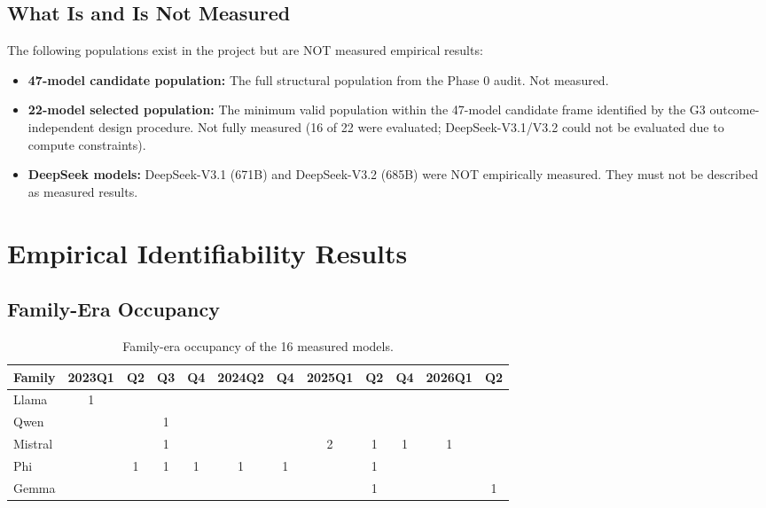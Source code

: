 \documentclass[journal]{IEEEtran}
\begin{document}
\subsection{What Is and Is Not Measured}

The following populations exist in the project but are NOT measured empirical results:
\begin{itemize}
\item \textbf{47-model candidate population:} The full structural population from the Phase 0 audit. Not measured.
\item \textbf{22-model selected population:} The minimum valid population within the 47-model candidate frame identified by the G3 outcome-independent design procedure. Not fully measured (16 of 22 were evaluated; DeepSeek-V3.1/V3.2 could not be evaluated due to compute constraints).
\item \textbf{DeepSeek models:} DeepSeek-V3.1 (671B) and DeepSeek-V3.2 (685B) were NOT empirically measured. They must not be described as measured results.
\end{itemize}

\section{Empirical Identifiability Results}
\label{sec:empirical_results}

\subsection{Family-Era Occupancy}

\begin{table}[!t]
\centering
\caption{Family-era occupancy of the 16 measured models.}
\label{tab:occupancy}
\begin{tabular}{lccccccccccc}
\toprule
Family & 2023Q1 & Q2 & Q3 & Q4 & 2024Q2 & Q4 & 2025Q1 & Q2 & Q4 & 2026Q1 & Q2 \\
\midrule
Llama & 1 & & & & & & & & & & \\
Qwen & & & 1 & & & & & & & & \\
Mistral & & & 1 & & & & 2 & 1 & 1 & 1 & \\
Phi & & 1 & 1 & 1 & 1 & 1 & & 1 & & & \\
Gemma & & & & & & & & 1 & & & 1 \\
\bottomrule
\end{tabular}
\end{table}
\end{document}
